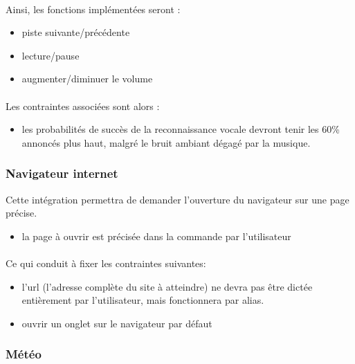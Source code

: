 \documentclass[12pt]{article}
\begin{document}
    \paragraph{}
    Ainsi, les fonctions implémentées seront :
    \begin{itemize}
        \item piste suivante/précédente
        \item lecture/pause
        \item augmenter/diminuer le volume
    \end{itemize}

    \paragraph{}
    Les contraintes associées sont alors :
    \begin{itemize}
        \item les probabilités de succès de la reconnaissance vocale devront
            tenir les 60\% annoncés plus haut, malgré le bruit ambiant dégagé
            par la musique.
    \end{itemize}

    \subsubsection{Navigateur internet}
    Cette intégration permettra de demander l'ouverture du navigateur sur une
    page précise.

    \begin{itemize}
        \item la page à ouvrir est précisée dans la commande par l'utilisateur
    \end{itemize}

    \paragraph{}
    Ce qui conduit à fixer les contraintes suivantes:
    \begin{itemize}
        \item l'url (l'adresse complète du site à atteindre) ne devra pas être
            dictée entièrement par l'utilisateur, mais fonctionnera par alias.
        \item ouvrir un onglet sur le navigateur par défaut
    \end{itemize}

    \subsubsection{Météo}
\end{document}
